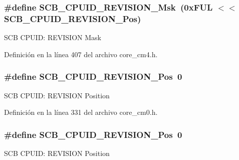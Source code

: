 \subsubsection[{\texorpdfstring{S\+C\+B\+\_\+\+C\+P\+U\+I\+D\+\_\+\+R\+E\+V\+I\+S\+I\+O\+N\+\_\+\+Msk}{SCB_CPUID_REVISION_Msk}}]{\setlength{\rightskip}{0pt plus 5cm}\#define S\+C\+B\+\_\+\+C\+P\+U\+I\+D\+\_\+\+R\+E\+V\+I\+S\+I\+O\+N\+\_\+\+Msk~(0x\+F\+U\+L $<$$<$ S\+C\+B\+\_\+\+C\+P\+U\+I\+D\+\_\+\+R\+E\+V\+I\+S\+I\+O\+N\+\_\+\+Pos)}\hypertarget{group___c_m_s_i_s___s_c_b_ga2ec0448b6483f77e7f5d08b4b81d85df}{}\label{group___c_m_s_i_s___s_c_b_ga2ec0448b6483f77e7f5d08b4b81d85df}
S\+CB C\+P\+U\+ID\+: R\+E\+V\+I\+S\+I\+ON Mask 

Definición en la línea 407 del archivo core\+\_\+cm4.\+h.

\subsubsection[{\texorpdfstring{S\+C\+B\+\_\+\+C\+P\+U\+I\+D\+\_\+\+R\+E\+V\+I\+S\+I\+O\+N\+\_\+\+Pos}{SCB_CPUID_REVISION_Pos}}]{\setlength{\rightskip}{0pt plus 5cm}\#define S\+C\+B\+\_\+\+C\+P\+U\+I\+D\+\_\+\+R\+E\+V\+I\+S\+I\+O\+N\+\_\+\+Pos~0}\hypertarget{group___c_m_s_i_s___s_c_b_ga3c3d9071e574de11fb27ba57034838b1}{}\label{group___c_m_s_i_s___s_c_b_ga3c3d9071e574de11fb27ba57034838b1}
S\+CB C\+P\+U\+ID\+: R\+E\+V\+I\+S\+I\+ON Position 

Definición en la línea 331 del archivo core\+\_\+cm0.\+h.

\subsubsection[{\texorpdfstring{S\+C\+B\+\_\+\+C\+P\+U\+I\+D\+\_\+\+R\+E\+V\+I\+S\+I\+O\+N\+\_\+\+Pos}{SCB_CPUID_REVISION_Pos}}]{\setlength{\rightskip}{0pt plus 5cm}\#define S\+C\+B\+\_\+\+C\+P\+U\+I\+D\+\_\+\+R\+E\+V\+I\+S\+I\+O\+N\+\_\+\+Pos~0}\hypertarget{group___c_m_s_i_s___s_c_b_ga3c3d9071e574de11fb27ba57034838b1}{}\label{group___c_m_s_i_s___s_c_b_ga3c3d9071e574de11fb27ba57034838b1}
S\+CB C\+P\+U\+ID\+: R\+E\+V\+I\+S\+I\+ON Position 

